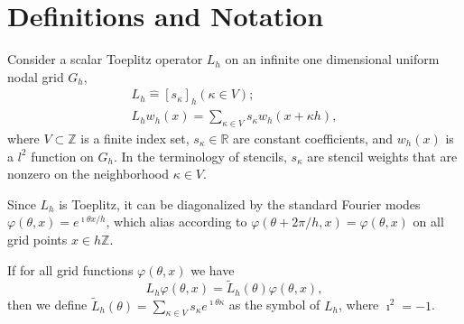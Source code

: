 \documentclass[review]{siamart190516}
\begin{document}
\section{Definitions and Notation}\label{sec:notation}


Consider a scalar Toeplitz operator $L_h$ on an infinite one dimensional uniform nodal grid $G_h$,
\begin{equation}
\begin{split}
L_h \mathrel{\hat{=}} \left[ s_\kappa \right]_h \left( \kappa \in V \right);\\
L_h w_h \left( x \right) = \sum_{\kappa \in V} s_\kappa w_h \left( x + \kappa h \right),
\end{split}
\end{equation}
where $V \subset \mathbb{Z}$ is a finite index set, $s_\kappa \in \mathbb{R}$ are constant coefficients, and $w_h \left( x \right)$ is a $l^2$ function on $G_h$. In the terminology of stencils, $s_{\kappa}$ are stencil weights that are nonzero on the neighborhood $\kappa \in V$.

Since $L_h$ is Toeplitz, it can be diagonalized by the standard Fourier modes $\varphi \left( \theta, x \right) = e^{\imath \theta x / h}$, which alias according to $\varphi(\theta+ 2\pi/h, x) = \varphi(\theta, x)$ on all grid points $x \in h \mathbb Z$.

\begin{definition}[Symbol of $L_h$]\label{def:symbol}
If for all grid functions $\varphi \left( \theta, x \right)$ we have
\begin{equation}
L_h \varphi \left( \theta, x \right) = \tilde{L}_h \left( \theta \right) \varphi \left( \theta, x \right),
\end{equation}
then we define $\tilde{L}_h \left( \theta \right) = \sum_{\kappa \in V} s_\kappa e^{\imath \theta \kappa}$ as the symbol of $L_h$, where $\imath^2 = -1$.
\end{definition}
\end{document}
